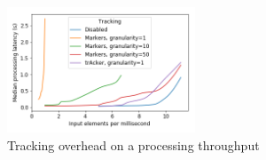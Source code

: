 
\begin{figure}[htbp]
  \centering
  \includegraphics[width=0.50\textwidth]{pics/throughput_overhead_50.png}
  \caption{Tracking overhead on a processing throughput}
  \label{throughput_overhead}
\end{figure}

